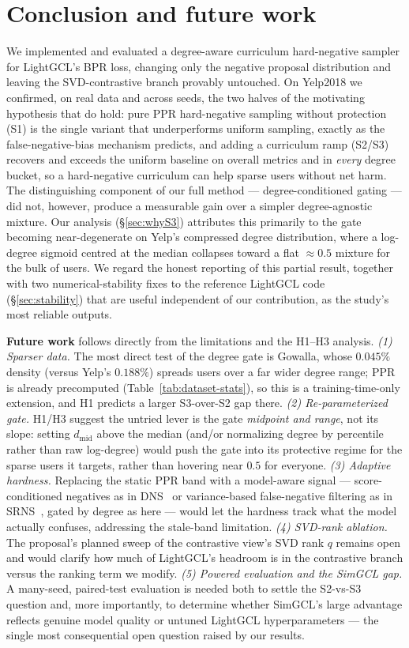 \documentclass{article}
\begin{document}
\section{Conclusion and future work}
\label{sec:conclusion}

We implemented and evaluated a degree-aware curriculum hard-negative sampler for
LightGCL's BPR loss, changing only the negative proposal distribution and leaving the
SVD-contrastive branch provably untouched. On Yelp2018 we confirmed, on real data and
across seeds, the two halves of the motivating hypothesis that do hold: pure PPR
hard-negative sampling without protection (S1) is the single variant that underperforms
uniform sampling, exactly as the false-negative-bias mechanism predicts, and adding a
curriculum ramp (S2/S3) recovers and exceeds the uniform baseline on overall metrics
and in \emph{every} degree bucket, so a hard-negative curriculum can help sparse users
without net harm. The distinguishing component of our full method --- degree-conditioned
gating --- did not, however, produce a measurable gain over a simpler degree-agnostic
mixture. Our analysis (\S\ref{sec:whyS3}) attributes this primarily to the gate becoming
near-degenerate on Yelp's compressed degree distribution, where a log-degree sigmoid
centred at the median collapses toward a flat $\approx\!0.5$ mixture for the bulk of
users. We regard the honest reporting of this partial result, together with two
numerical-stability fixes to the reference LightGCL code (\S\ref{sec:stability}) that
are useful independent of our contribution, as the study's most reliable outputs.

\textbf{Future work} follows directly from the limitations and the H1--H3 analysis.
\emph{(1) Sparser data.} The most direct test of the degree gate is Gowalla, whose
$0.045\%$ density (versus Yelp's $0.188\%$) spreads users over a far wider degree
range; PPR is already precomputed (Table~\ref{tab:dataset-stats}), so this is a
training-time-only extension, and H1 predicts a larger S3-over-S2 gap there.
\emph{(2) Re-parameterized gate.} H1/H3 suggest the untried lever is the gate
\emph{midpoint and range}, not its slope: setting $d_{\mathrm{mid}}$ above the median
(and/or normalizing degree by percentile rather than raw log-degree) would push the
gate into its protective regime for the sparse users it targets, rather than hovering
near $0.5$ for everyone. \emph{(3) Adaptive hardness.} Replacing the static PPR band
with a model-aware signal --- score-conditioned negatives as in DNS~\cite{dns} or
variance-based false-negative filtering as in SRNS~\cite{srns}, gated by degree as
here --- would let the hardness track what the model actually confuses, addressing the
stale-band limitation. \emph{(4) SVD-rank ablation.} The proposal's planned sweep of
the contrastive view's SVD rank $q$ remains open and would clarify how much of
LightGCL's headroom is in the contrastive branch versus the ranking term we modify.
\emph{(5) Powered evaluation and the SimGCL gap.} A many-seed, paired-test evaluation
is needed both to settle the S2-vs-S3 question and, more importantly, to determine
whether SimGCL's large advantage reflects genuine model quality or untuned LightGCL
hyperparameters --- the single most consequential open question raised by our results.
\end{document}
